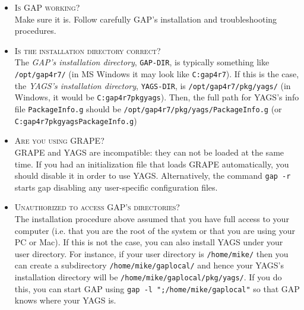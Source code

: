 \documentclass[a4paper,11pt]{report}
\begin{document}
{{\begin{itemize}
\item \textsc{Is }\textsf{GAP}\textsc{ working?}\\
 Make sure it is. Follow carefully \textsf{GAP}'s installation and troubleshooting procedures. 
\item \textsc{Is the installation directory correct?}\\
 The \emph{\textsf{GAP}'s installation directory}, \texttt{GAP-DIR},   is typically something like \texttt{/opt/gap4r7/} (in MS Windows it may look like \texttt{C:\texttt{}gap4r7\texttt{}}). If this is the case, the \emph{\textsf{YAGS}'s installation directory}, \texttt{YAGS-DIR}, is   \texttt{/opt/gap4r7/pkg/yags/} (in Windows, it would be \texttt{C:\texttt{}gap4r7\texttt{}pkg\texttt{}yags\texttt{}}). Then, the full path for \textsf{YAGS}'s info file \texttt{PackageInfo.g} should be \texttt{/opt/gap4r7/pkg/yags/PackageInfo.g} (or \texttt{C:\texttt{}gap4r7\texttt{}pkg\texttt{}yags\texttt{}PackageInfo.g}) 
\item \textsc{Are you using }\textsf{GRAPE}\textsc{?}\\
 \textsf{GRAPE} and \textsf{YAGS} are incompatible: they can not be loaded at the same time. If you had an
initialization file that loads \textsf{GRAPE} automatically, you should disable it in order to use \textsf{YAGS}. Alternatively, the command \texttt{gap -r} starts gap disabling any user-specific configuration files. 
\item \textsc{Unauthorized to access }\textsf{GAP}\textsc{'s directories?}\\
 The installation procedure above assumed that you have full access to your
computer (i.e. that you are the root of the system or that you are using your
PC or Mac). If this is not the case, you can also install \textsf{YAGS} under your user directory. For instance, if your user directory is \texttt{/home/mike/} then you can create a subdirectory \texttt{/home/mike/gaplocal/} and hence your \textsf{YAGS}'s installation directory will be \texttt{/home/mike/gaplocal/pkg/yags/}. If you do this, you can start \textsf{GAP} using \texttt{gap -l ";/home/mike/gaplocal"} so that \textsf{GAP} knows where your \textsf{YAGS} is. 
\end{itemize}
 }

}
\end{document}
